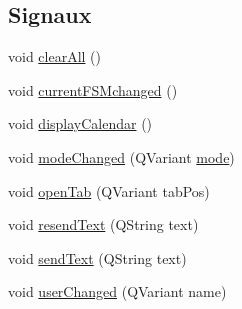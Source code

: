 \subsection*{Signaux}
\begin{DoxyCompactItemize}
\item 
void \hyperlink{classSimpleHotel_1_1SH__ApplicationCore_ad2ece925fc099554e1943684206e4cec}{clear\-All} ()
\item 
void \hyperlink{classSimpleHotel_1_1SH__ApplicationCore_a89131ceaccf4a82d94484a89ea11b453}{current\-F\-S\-Mchanged} ()
\item 
void \hyperlink{classSimpleHotel_1_1SH__ApplicationCore_a2eeb69302b906b8e1dbcfbdbd7069f14}{display\-Calendar} ()
\item 
void \hyperlink{classSimpleHotel_1_1SH__ApplicationCore_a475ef9dd466cc3431d876ac7918d190f}{mode\-Changed} (Q\-Variant \hyperlink{classSimpleHotel_1_1SH__ApplicationCore_a508c10bf5c106f265f314ee1c0e113ae}{mode})
\item 
void \hyperlink{classSimpleHotel_1_1SH__ApplicationCore_a9311fae224b8494feaa78c25d7fc657b}{open\-Tab} (Q\-Variant tab\-Pos)
\item 
void \hyperlink{classSimpleHotel_1_1SH__ApplicationCore_a5efca063423bec2a36ae72ea506aa2d6}{resend\-Text} (Q\-String text)
\item 
void \hyperlink{classSimpleHotel_1_1SH__ApplicationCore_ade1b758816c051515fac381418aada14}{send\-Text} (Q\-String text)
\item 
void \hyperlink{classSimpleHotel_1_1SH__ApplicationCore_a7e29b9cd8e14d86b30180a60166a927f}{user\-Changed} (Q\-Variant name)
\end{DoxyCompactItemize}
